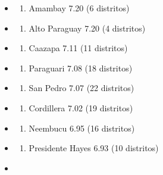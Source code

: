 \begin{itemize}
\tightlist
\item
  \begin{enumerate}
  \def\labelenumi{\arabic{enumi}.}
  \tightlist
  \item
    Amambay 7.20 (6 distritos)
  \end{enumerate}
\item
  \begin{enumerate}
  \def\labelenumi{\arabic{enumi}.}
  \setcounter{enumi}{1}
  \tightlist
  \item
    Alto Paraguay 7.20 (4 distritos)
  \end{enumerate}
\item
  \begin{enumerate}
  \def\labelenumi{\arabic{enumi}.}
  \setcounter{enumi}{2}
  \tightlist
  \item
    Caazapa 7.11 (11 distritos)
  \end{enumerate}
\item
  \begin{enumerate}
  \def\labelenumi{\arabic{enumi}.}
  \setcounter{enumi}{3}
  \tightlist
  \item
    Paraguari 7.08 (18 distritos)
  \end{enumerate}
\item
  \begin{enumerate}
  \def\labelenumi{\arabic{enumi}.}
  \setcounter{enumi}{4}
  \tightlist
  \item
    San Pedro 7.07 (22 distritos)
  \end{enumerate}
\item
  \begin{enumerate}
  \def\labelenumi{\arabic{enumi}.}
  \setcounter{enumi}{5}
  \tightlist
  \item
    Cordillera 7.02 (19 distritos)
  \end{enumerate}
\item
  \begin{enumerate}
  \def\labelenumi{\arabic{enumi}.}
  \setcounter{enumi}{6}
  \tightlist
  \item
    Neembucu 6.95 (16 distritos)
  \end{enumerate}
\item
  \begin{enumerate}
  \def\labelenumi{\arabic{enumi}.}
  \setcounter{enumi}{7}
  \tightlist
  \item
    Presidente Hayes 6.93 (10 distritos)
  \end{enumerate}
\item

\end{itemize}
